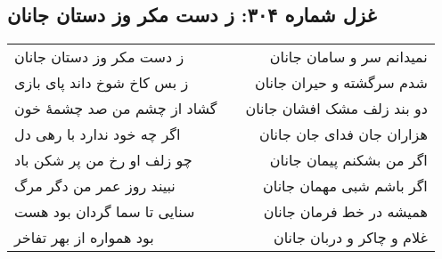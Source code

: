 \begin{center}
\section*{غزل شماره ۳۰۴: ز دست مکر وز دستان جانان}
\label{sec:304}
\begin{longtable}{l p{0.5cm} r}
ز دست مکر وز دستان جانان
&&
نمیدانم سر و سامان جانان
\\
ز بس کاخ شوخ داند پای بازی
&&
شدم سرگشته و حیران جانان
\\
گشاد از چشم من صد چشمهٔ خون
&&
دو بند زلف مشک افشان جانان
\\
اگر چه خود ندارد با رهی دل
&&
هزاران جان فدای جان جانان
\\
چو زلف او رخ من پر شکن باد
&&
اگر من بشکنم پیمان جانان
\\
نبیند روز عمر من دگر مرگ
&&
اگر باشم شبی مهمان جانان
\\
سنایی تا سما گردان بود هست
&&
همیشه در خط فرمان جانان
\\
بود همواره از بهر تفاخر
&&
غلام و چاکر و دربان جانان
\\
\end{longtable}
\end{center}
